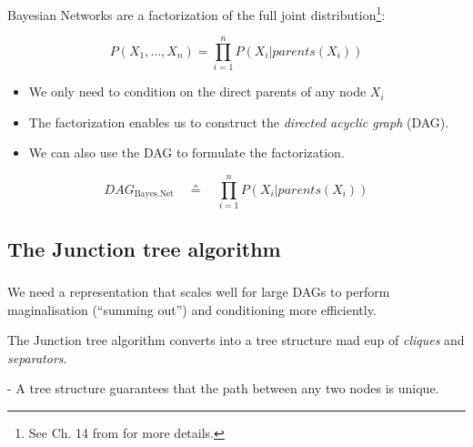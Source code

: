 \begin{frame}\frametitle{\secname}
  
Bayesian Networks are a factorization of the full joint distribution\footnote{See Ch. 14 from \citep{russell2016artificial} for more details.}:

\begin{equation}
P(X_{1},\ldots,X_{n}) = \prod_{i=1}^{n} P(X_{i} | parents(X_{i}))
\end{equation}
    
\begin{itemize}
\item We only need to condition on the direct parents of any node $X_i$

\pause 
\item The factorization enables us to construct the \emph{directed acyclic graph} (DAG).
\item We can also use the DAG to formulate the factorization.
\end{itemize}

\begin{equation}
\mathit{DAG}_{\text{Bayes.Net}} \quad \corresponds \quad \prod_{i=1}^{n} P(X_{i} | parents(X_{i}))
\end{equation}
    
\end{frame}

\subsection{The Junction tree algorithm}

\begin{frame}\frametitle{\subsecname}

We need a representation that scales well for large DAGs to perform maginalisation (``summing out'') and conditioning more efficiently.

The Junction tree algorithm converts into a tree structure mad eup of \emph{cliques} and \emph{separators}.


\pause

- A tree structure guarantees that the path between any two nodes is unique.

\end{frame}

